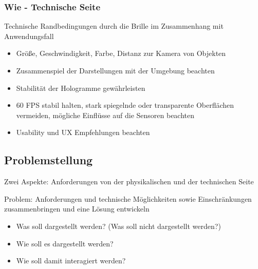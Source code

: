 \subsubsection{Wie - Technische Seite}
Technische Randbedingungen durch die Brille im Zusammenhang mit Anwendungsfall
\begin{itemize}
	\setlength{\itemsep}{-5pt}
	\item Größe, Geschwindigkeit, Farbe, Distanz zur Kamera von Objekten
	\item Zusammenspiel der Darstellungen mit der Umgebung beachten
	\item Stabilität der Hologramme gewährleisten
	\item 60 FPS stabil halten, stark spiegelnde oder transparente Oberflächen vermeiden, mögliche Einflüsse auf die Sensoren beachten
	\item Usability und UX Empfehlungen beachten
\end{itemize}

\subsection{Problemstellung}
\label{sec-3-2}
Zwei Aspekte: Anforderungen von der physikalischen und der technischen Seite

Problem: Anforderungen und technische Möglichkeiten sowie Einschränkungen zusammenbringen und eine Lösung entwickeln
\begin{itemize}
	\item Was soll dargestellt werden? (Was soll nicht dargestellt werden?)
	\item Wie soll es dargestellt werden?
	\item Wie soll damit interagiert werden?
\end{itemize}

